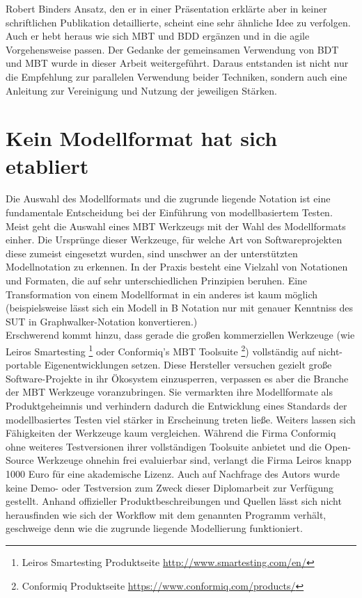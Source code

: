 Robert Binders Ansatz, den er in einer Präsentation \cite{binder_model-based_2014} erklärte aber in keiner schriftlichen Publikation detaillierte, scheint eine sehr ähnliche Idee zu verfolgen. Auch er hebt heraus wie sich \Gls{MBT} und \Gls{BDD} ergänzen und in die agile Vorgehensweise passen. Der Gedanke der gemeinsamen Verwendung von \Gls{BDT} und \Gls{MBT} wurde in dieser Arbeit weitergeführt. Daraus entstanden ist nicht nur die Empfehlung zur parallelen Verwendung beider Techniken, sondern auch eine Anleitung zur Vereinigung und Nutzung der jeweiligen Stärken.


\section{Kein Modellformat hat sich etabliert}
\label{sec:discussion_format}
Die Auswahl des Modellformats und die zugrunde liegende Notation ist eine fundamentale Entscheidung bei der Einführung von modellbasiertem Testen. Meist geht die Auswahl eines \Gls{MBT} Werkzeugs mit der Wahl des Modellformats einher. Die Ursprünge dieser Werkzeuge, für welche Art von Softwareprojekten diese zumeist eingesetzt wurden, sind unschwer an der unterstützten Modellnotation zu erkennen.  In der Praxis besteht eine Vielzahl von Notationen und Formaten, die auf sehr unterschiedlichen Prinzipien beruhen. Eine Transformation von einem Modellformat in ein anderes ist kaum möglich (beispielsweise lässt sich ein Modell in B Notation nur mit genauer Kenntniss des \Gls{SUT} in Graphwalker-Notation konvertieren.)\\
Erschwerend kommt hinzu, dass gerade die großen kommerziellen Werkzeuge (wie Leiros Smartesting \footnote{Leiros Smartesting Produktseite \url{http://www.smartesting.com/en/}} oder Conformiq's \Gls{MBT} Toolsuite \footnote{Conformiq Produktseite \url{https://www.conformiq.com/products/}}) vollständig auf nicht-portable Eigenentwicklungen setzen. Diese Hersteller versuchen gezielt große Software-Projekte in ihr Ökosystem einzusperren, verpassen es aber die Branche der \Gls{MBT} Werkzeuge voranzubringen. Sie vermarkten ihre Modellformate als Produktgeheimnis und verhindern dadurch die Entwicklung eines Standards der modellbasiertes Testen viel stärker in Erscheinung treten ließe. Weiters lassen sich Fähigkeiten der Werkzeuge kaum vergleichen. Während die Firma Conformiq ohne weiteres Testversionen ihrer vollständigen Toolsuite anbietet und die Open-Source Werkzeuge ohnehin frei evaluierbar sind, verlangt die Firma Leiros knapp 1000 Euro für eine akademische Lizenz. Auch auf Nachfrage des Autors wurde keine Demo- oder Testversion zum Zweck dieser Diplomarbeit zur Verfügung gestellt. Anhand offizieller Produktbeschreibungen und Quellen lässt sich nicht herausfinden wie sich der Workflow mit dem genannten Programm verhält, geschweige denn wie die zugrunde liegende Modellierung funktioniert.\\
